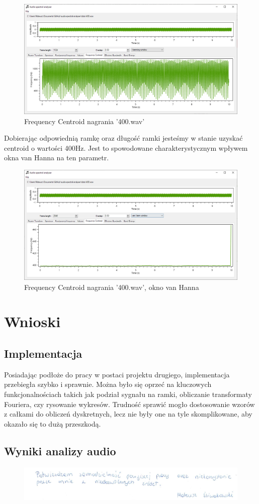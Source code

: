 \documentclass{article}
\begin{document}
\begin{figure}[H]
\includegraphics[width=6in]{scr6.png}
\centering
\caption{Frequency Centroid nagrania '400.wav'}
\end{figure}

\noindent Dobierając odpowiednią ramkę oraz długość ramki jesteśmy w stanie uzyskać centroid o wartości 400Hz. Jest to spowodowane charakterystycznym wpływem okna van Hanna na ten parametr.

\begin{figure}[H]
\includegraphics[width=6in]{scr7.png}
\centering
\caption{Frequency Centroid nagrania '400.wav', okno van Hanna}
\end{figure}

\section{Wnioski}
\subsection{Implementacja}
Posiadając podłoże do pracy w postaci projektu drugiego, implementacja przebiegła szybko i sprawnie. Można było się oprzeć na kluczowych funkcjonalnościach takich jak podział sygnału na ramki, obliczanie transformaty Fouriera, czy rysowanie wykresów. Trudność sprawić mogło dostosowanie wzorów z całkami do obliczeń dyskretnych, lecz nie były one na tyle skomplikowane, aby okazało się to dużą przeszkodą.

\subsection{Wyniki analizy audio}


\begin{figure}[b]
\centering
\includegraphics[width=5in]{bottom.png}
\end{figure}
\end{document}
